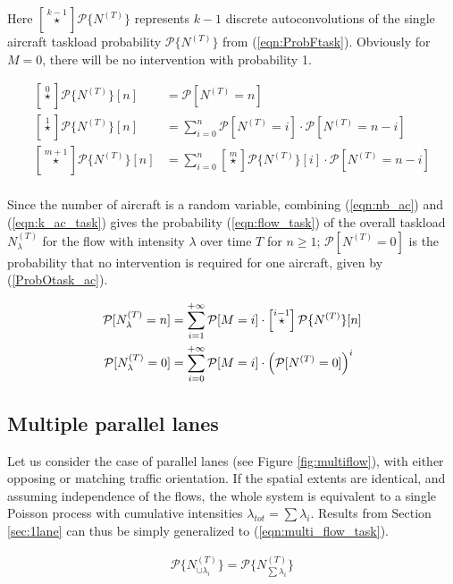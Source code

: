 \documentclass[conference]{IEEEtran}
\begin{document}
Here $\left[\stackrel{k-1}{\star}\right]\mathcal P\{N^{(T)}\}$ represents $k-1$ discrete autoconvolutions of the single aircraft taskload probability $\mathcal P\{N^{(T)}\}$ from (\ref{eqn:ProbFtask}). Obviously for $M=0$, there will be no intervention with probability 1.

\begin{align*}
\left[\stackrel{0}{\star}\right]\mathcal P\{N^{(T)}\}[n]&=\mathcal P[N^{(T)}=n] \\
\left[\stackrel{1}{\star}\right]\mathcal P\{N^{(T)}\}[n]&=\sum\limits_{i=0}^n \mathcal P[N^{(T)}=i]\cdot \mathcal P[N^{(T)}=n-i]\\
\left[\stackrel{m+1}{\star}\right]\mathcal P\{N^{(T)}\}[n]&=\sum\limits_{i=0}^n \left[\stackrel{m}{\star}\right]\mathcal P\{N^{(T)}\}[i]\cdot \mathcal P[N^{(T)}=n-i]\\
\end{align*}

Since the number of aircraft is a random variable, combining (\ref{eqn:nb_ac}) and (\ref{eqn:k_ac_task}) gives the probability (\ref{eqn:flow_task}) of the overall taskload $N^{(T)}_{\lambda}$ for the flow with intensity $\lambda$ over time $T$ for $n\ge1$; $\mathcal P[N^{(T)}=0]$ is the probability that no intervention is required for one aircraft, given by (\ref{ProbOtask_ac}).

\begin{align}
\mathcal P[N^{(T)}_{\lambda}=n]&=\sum\limits_{i=1}^{+\infty}\mathcal P[M=i]\cdot\left[\stackrel{i-1}{\star}\right]\mathcal P\{N^{(T)}\}[n] \label{eqn:flow_task}\\
\mathcal P[N^{(T)}_{\lambda}=0]&=\sum\limits_{i=0}^{+\infty}\mathcal P[M=i]\cdot \left(\mathcal P[N^{(T)}=0]\right)^i\notag\
\end{align}

\subsection{Multiple parallel lanes}
\label{sec:multilane_model}
Let us consider the case of parallel lanes (see Figure \ref{fig:multiflow}), with either opposing or matching traffic orientation.  If the spatial extents are identical, and assuming independence of the flows, the whole system is equivalent to a single Poisson process with cumulative intensities $\lambda_{tot}=\sum\lambda_i$. Results from Section \ref{sec:1lane} can thus be simply generalized to (\ref{eqn:multi_flow_task}).

\begin{align}
\mathcal P\{N^{(T)}_{\cup\lambda_i}\}= \mathcal P\{N^{(T)}_{\sum\lambda_i}\} \label{eqn:multi_flow_task}
\end{align}
\end{document}
